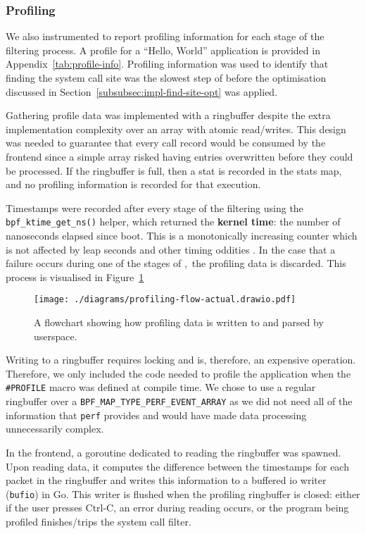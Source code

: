 \subsubsection{Profiling}

We also instrumented \af to report profiling information for each stage of the
filtering process. A profile for a ``Hello, World'' application is provided in 
Appendix~\ref{tab:profile-info}. Profiling information was used to identify that
finding the system call site was the slowest step of \af before the optimisation
discussed in Section~\ref{subsubsec:impl-find-site-opt} was applied.

Gathering profile data was implemented with a ringbuffer despite the extra
implementation complexity over an array with atomic read/writes. This design was
needed to guarantee that every call record would be consumed by the frontend since a 
simple array risked having entries overwritten before they could be processed.
If the ringbuffer is full, then a stat is recorded in the stats map, and no
profiling information is recorded for that execution.

Timestamps were recorded after every stage of the filtering using the
\texttt{bpf\_ktime\_get\_ns()} helper, which returned the \textbf{kernel time}:
the number of nanoseconds elapsed since boot. This is a monotonically increasing
counter which is not affected by leap seconds and other timing oddities \cite{ebpf-bpf-ktime-get-ns-2025}. In the
case that a failure occurs during one of the stages of \afss,~the profiling data
is discarded. This process is visualised in Figure~\ref{fig:profiling-data-flow}


\begin{figure}[hbpt]
\centering
\texttt{[image: ./diagrams/profiling-flow-actual.drawio.pdf]}
\caption{A flowchart showing how profiling data is written to and parsed by
userspace.}
\label{fig:profiling-data-flow}
\end{figure}

Writing to a ringbuffer requires locking and is, therefore, an expensive
operation. Therefore, we only included the code needed to profile the
application when the \texttt{\#PROFILE} macro was defined at compile time.
We chose to use a regular ringbuffer over a 
\texttt{BPF\_MAP\_TYPE\_PERF\_EVENT\_ARRAY} as we did not need all of the
information that \texttt{perf} provides and would have made data processing
unnecessarily complex.

In the frontend, a goroutine dedicated to reading the ringbuffer was spawned.
Upon reading data, it computes the difference between the timestamps for each 
packet in the ringbuffer and writes this information to a buffered \ac{io} 
writer (\texttt{bufio}) in Go. This writer is flushed when the profiling 
ringbuffer is closed: either if the user presses Ctrl-C, an error during 
reading occurs, or the program being profiled finishes/trips the system call 
filter.

